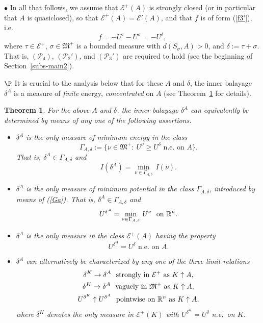 \documentclass[12pt,a4paper,reqno]{amsart} %
\theoremstyle{lause}
\theoremstyle{maaritelma}
\theoremstyle{lause}
\newtheorem{theorem}{Theorem}[section]
\theoremstyle{maaritelma}
\numberwithin{equation}{section}
\begin{document}
$\bullet$ In all that follows, we assume that $\mathcal E^+(A)$ is strongly closed (or in particular that $A$ is quasiclosed), so that $\mathcal E^+(A)=\mathcal E'(A)$, and that $f$ is of form (\ref{f3'}), i.e.
\begin{equation*}
f=-U^\tau-U^\sigma=-U^\delta,
\end{equation*}
where $\tau\in\mathcal E^+$, $\sigma\in\mathfrak M^+$ is a bounded measure with $d(S_\sigma,A)>0$, and
$\delta:=\tau+\sigma$. That is, $(\mathcal P_4)$, $(\mathcal P_2')$, and $(\mathcal P_3')$ are required to hold (see the beginning of Section~\ref{subs-main2}).

$\P$ It is crucial to the analysis below that for these $A$ and $\delta$, the inner balayage $\delta^A$ is a measure of {\it finite} energy, {\it concentrated} on $A$ (see Theorem~\ref{th-bal} for details).

\begin{theorem}\label{th-bal}
For the above $A$ and $\delta$, the inner balayage $\delta^A$ can equivalently be determined by means of any one of the following assertions.
\begin{itemize}
\item[{\rm(i$_1$)}] $\delta^A$ is the only measure of minimum energy in the class
\begin{equation}\label{Ga}
 \Gamma_{A,\delta}:=\bigl\{\nu\in\mathfrak M^+:\ U^\nu\geqslant U^\delta\text{ \ n.e.\ on $A$}\bigr\}.
 \end{equation}
That is, $\delta^A\in\Gamma_{A,\delta}$ and
 \begin{equation*}\label{delta-alt}
  I(\delta^A)=\min_{\nu\in\Gamma_{A,\delta}}\,I(\nu).
  \end{equation*}
  \item[{\rm(ii$_1$)}] $\delta^A$ is the only measure of minimum potential in the class $\Gamma_{A,\delta}$, introduced by means of {\rm(\ref{Ga})}. That is, $\delta^A\in\Gamma_{A,\delta}$  and
  \begin{equation*}\label{Gap}U^{\delta^A}=\min_{\nu\in\Gamma_{A,\delta}}\,U^\nu\text{ \ on\/ $\mathbb R^n$}.\end{equation*}
  \item[{\rm(iii$_1$)}] $\delta^A$ is the only measure in the class $\mathcal E^+(A)$ having the property
  \[U^{\delta^A}=U^\delta\text{ \  n.e.\ on $A$.}\]
    \item[{\rm(iv$_1$)}] $\delta^A$ can alternatively be characterized by any one of the three limit relations
  \begin{gather}
  \label{char1}\delta^K\to\delta^A\text{ \ strongly in $\mathcal E^+$ as $K\uparrow A$},\\
   \label{char2}\delta^K\to\delta^A\text{ \ vaguely in $\mathfrak M^+$ as $K\uparrow A$},\\
   U^{\delta^K}\uparrow U^{\delta^A}\text{ \ pointwise on $\mathbb R^n$ as $K\uparrow A$},\notag
  \end{gather}
  where $\delta^K$ denotes the only measure in $\mathcal E^+(K)$ with $U^{\delta^K}=U^\delta$ n.e.\ on $K$.
\end{itemize}
\end{theorem}
\end{document}
